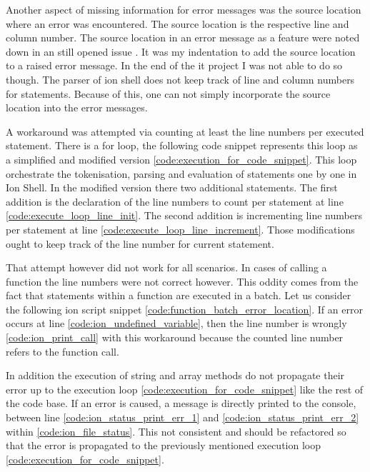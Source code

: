 Another aspect of missing information for error messages was the source location where an error was encountered.
The source location is the respective line and column number.
The source location in an error message as a feature were noted down
in an still opened issue \cite{issue_enrich_error_message_information} .
It was my indentation to add the source location to a raised error message.
In the end of the it project I was not able to do so though.
The parser of ion shell does not keep track of line and column numbers for statements.
Because of this, one can not simply incorporate the source location into the error messages.

A workaround was attempted via counting at least the line numbers per executed statement.
There is a for loop, the following code snippet represents this loop as a simplified and
modified version \ref{code:execution_for_code_snippet}.
This loop orchestrate the tokenisation, parsing and evaluation of statements one by one in Ion Shell.
In the modified version there two additional statements.
The first addition is the declaration of the line numbers
to count per statement at line \ref{code:execute_loop_line_init}.
The second addition is incrementing line numbers per statement at line \ref{code:execute_loop_line_increment}.
Those modifications ought to keep track of the line number for current statement.

\clearpage


That attempt however did not work for all scenarios.
In cases of calling a function the line numbers were not correct however.
This oddity comes from the fact that statements within a function are executed in a batch.
Let us consider the following ion script snippet \ref{code:function_batch_error_location}.
If an error occurs at line \ref{code:ion_undefined_variable},
then the line number is wrongly \ref{code:ion_print_call}
with this workaround because the counted line number refers to the function call.

\clearpage


In addition the execution of string and array methods do not propagate their error up
to the execution loop \ref{code:execution_for_code_snippet} like the rest of the code base.
If an error is caused, a message is directly printed to the console,
between line \ref{code:ion_status_print_err_1} and \ref{code:ion_status_print_err_2} within \ref{code:ion_file_status}.
This not consistent and should be refactored so that the error is propagated
to the previously mentioned execution loop \ref{code:execution_for_code_snippet}.

